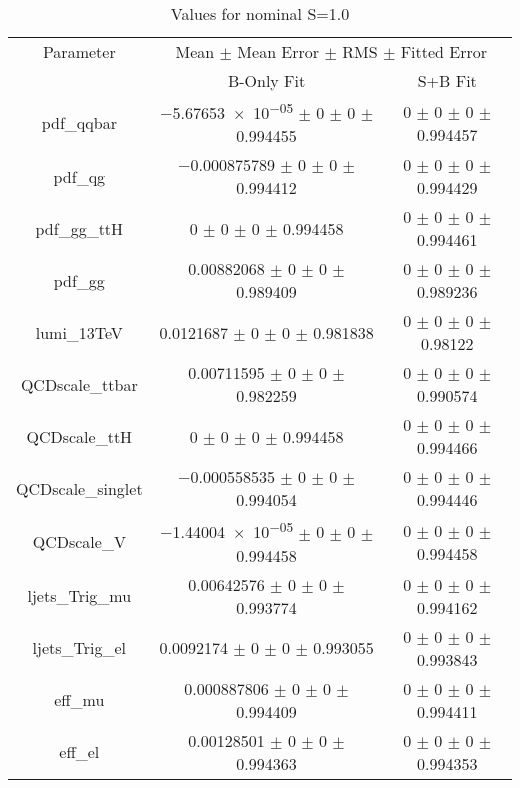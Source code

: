\begin{table}
\centering
\caption{Values for nominal S=1.0}
\begin{tabular}{ccc}
\toprule
Parameter 	& \multicolumn{2}{c}{Mean $\pm$ Mean Error $\pm$ RMS $\pm$ Fitted Error}\\
 	& B-Only Fit & S+B Fit\\
\midrule
pdf\_qqbar 	& \num{-5.67653e-05} $\pm$ \num{0} $\pm$ \num{0} $\pm$ \num{0.994455} 	& \num{0} $\pm$ \num{0} $\pm$ \num{0} $\pm$ \num{0.994457}\\
pdf\_qg 	& \num{-0.000875789} $\pm$ \num{0} $\pm$ \num{0} $\pm$ \num{0.994412} 	& \num{0} $\pm$ \num{0} $\pm$ \num{0} $\pm$ \num{0.994429}\\
pdf\_gg\_ttH 	& \num{0} $\pm$ \num{0} $\pm$ \num{0} $\pm$ \num{0.994458} 	& \num{0} $\pm$ \num{0} $\pm$ \num{0} $\pm$ \num{0.994461}\\
pdf\_gg 	& \num{0.00882068} $\pm$ \num{0} $\pm$ \num{0} $\pm$ \num{0.989409} 	& \num{0} $\pm$ \num{0} $\pm$ \num{0} $\pm$ \num{0.989236}\\
lumi\_13TeV 	& \num{0.0121687} $\pm$ \num{0} $\pm$ \num{0} $\pm$ \num{0.981838} 	& \num{0} $\pm$ \num{0} $\pm$ \num{0} $\pm$ \num{0.98122}\\
QCDscale\_ttbar 	& \num{0.00711595} $\pm$ \num{0} $\pm$ \num{0} $\pm$ \num{0.982259} 	& \num{0} $\pm$ \num{0} $\pm$ \num{0} $\pm$ \num{0.990574}\\
QCDscale\_ttH 	& \num{0} $\pm$ \num{0} $\pm$ \num{0} $\pm$ \num{0.994458} 	& \num{0} $\pm$ \num{0} $\pm$ \num{0} $\pm$ \num{0.994466}\\
QCDscale\_singlet 	& \num{-0.000558535} $\pm$ \num{0} $\pm$ \num{0} $\pm$ \num{0.994054} 	& \num{0} $\pm$ \num{0} $\pm$ \num{0} $\pm$ \num{0.994446}\\
QCDscale\_V 	& \num{-1.44004e-05} $\pm$ \num{0} $\pm$ \num{0} $\pm$ \num{0.994458} 	& \num{0} $\pm$ \num{0} $\pm$ \num{0} $\pm$ \num{0.994458}\\
ljets\_Trig\_mu 	& \num{0.00642576} $\pm$ \num{0} $\pm$ \num{0} $\pm$ \num{0.993774} 	& \num{0} $\pm$ \num{0} $\pm$ \num{0} $\pm$ \num{0.994162}\\
ljets\_Trig\_el 	& \num{0.0092174} $\pm$ \num{0} $\pm$ \num{0} $\pm$ \num{0.993055} 	& \num{0} $\pm$ \num{0} $\pm$ \num{0} $\pm$ \num{0.993843}\\
eff\_mu 	& \num{0.000887806} $\pm$ \num{0} $\pm$ \num{0} $\pm$ \num{0.994409} 	& \num{0} $\pm$ \num{0} $\pm$ \num{0} $\pm$ \num{0.994411}\\
eff\_el 	& \num{0.00128501} $\pm$ \num{0} $\pm$ \num{0} $\pm$ \num{0.994363} 	& \num{0} $\pm$ \num{0} $\pm$ \num{0} $\pm$ \num{0.994353}\\

\end{tabular}
\end{table}
